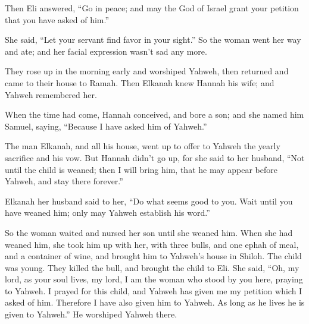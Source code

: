 {\par }{\PP {}Then Eli answered, “Go in peace; and may the God of Israel grant your petition that you have asked of him.”
\par }{\PP {}She said, “Let your servant find favor in your sight.” So the woman went her way and ate; and her facial expression wasn’t sad any more.
\par }{\PP {}They rose up in the morning early and worshiped Yahweh, then returned and came to their house to Ramah. Then Elkanah knew Hannah his wife; and Yahweh remembered her.
\par }{\PP {}When the time had come, Hannah conceived, and bore a son; and she named him Samuel, saying, “Because I have asked him of Yahweh.”
\par }{\PP {}The man Elkanah, and all his house, went up to offer to Yahweh the yearly sacrifice and his vow.
But Hannah didn’t go up, for she said to her husband, “Not until the child is weaned; then I will bring him, that he may appear before Yahweh, and stay there forever.”
\par }{\PP {}Elkanah her husband said to her, “Do what seems good to you. Wait until you have weaned him; only may Yahweh establish his word.”
\par }{\PP So the woman waited and nursed her son until she weaned him.
When she had weaned him, she took him up with her, with three bulls, and one ephah of meal, and a container of wine, and brought him to Yahweh’s house in Shiloh. The child was young.
They killed the bull, and brought the child to Eli.
She said, “Oh, my lord, as your soul lives, my lord, I am the woman who stood by you here, praying to Yahweh.
I prayed for this child, and Yahweh has given me my petition which I asked of him.
Therefore I have also given him to Yahweh. As long as he lives he is given to Yahweh.” He worshiped Yahweh there.

}
